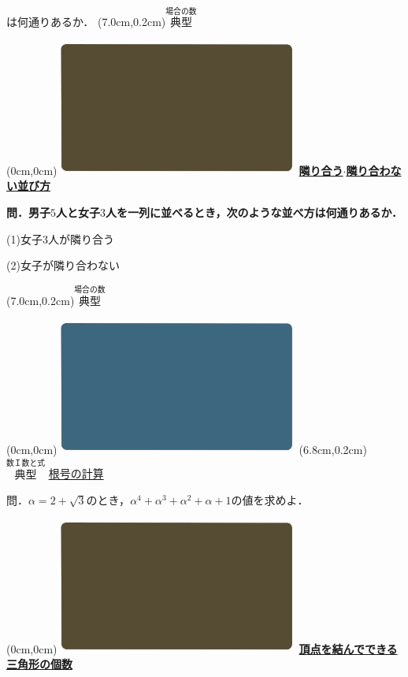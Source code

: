 \documentclass[10pt,
fleqn,
dvipdfmx,
uplatex
]{jsarticle}
\begin{document}
\normalsize
\hfill は何通りあるか．
\at(7.0cm,0.2cm){\small\color{bradorange}$\overset{\text{場合の数}}{\text{典型}}$}

\newpage

\at(0cm,0cm){\includegraphics[width=8cm,bb=0 0 1920 1080]{./youtube/thumbnails/templates/smart_background/場合の数.jpeg}}
{\color{orange}\bf\boldmath\Large\underline{隣り合う$\cdot$隣り合わない並び方}}\vspace{0.3zw}

\normalsize 
\bf\boldmath 問．男子$5$人と女子$3$人を一列に並べるとき，次のような並べ方は何通りあるか．

\huge
(1)女子$3$人が隣り合う

(2)女子が隣り合わない

\at(7.0cm,0.2cm){\small\color{bradorange}$\overset{\text{場合の数}}{\text{典型}}$}

\newpage



\at(0cm,0cm){\includegraphics[width=8cm,bb=0 0 1920 1080]{./youtube/thumbnails/templates/smart_background/数I数と式.jpeg}}
\at(6.8cm,0.2cm){\small\color{bradorange}$\overset{\text{数Ｉ数と式}}{\text{典型}}$}
{\color{orange}\huge\underline{根号の計算}}\vspace{0.3zw}

\huge 
問．$\alpha =2+\sqrt 3$のとき，$\alpha ^4+\alpha ^3+\alpha ^2+\alpha +1$の値を求めよ．


\newpage

\at(0cm,0cm){\includegraphics[width=8cm,bb=0 0 1920 1080]{./youtube/thumbnails/templates/smart_background/場合の数.jpeg}}
{\color{orange}\bf\boldmath\large\underline{頂点を結んでできる三角形の個数}}\vspace{0.1zw}
\end{document}
